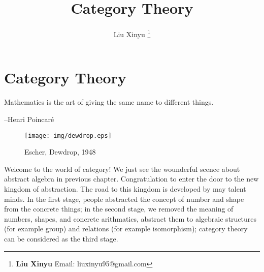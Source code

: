\documentclass{article}
\begin{document}
\title{Category Theory}

\author{Liu Xinyu
\thanks{{\bfseries Liu Xinyu} \newline
  Email: liuxinyu95@gmail.com \newline}
  }

\maketitle
\fi


\ifx\wholebook\relax
\chapter{Category Theory}
\fi

\epigraph{Mathematics is the art of giving the same name to different things.}{--Henri Poincaré}


\begin{wrapfigure}{R}{0.4\textwidth}
 \centering
 \texttt{[image: img/dewdrop.eps]}
 \captionsetup{labelformat=empty}
 \caption{Escher, Dewdrop, 1948}
 \label{fig:Escher-Dewdrop-1948}
\end{wrapfigure}

Welcome to the world of category! We just see the wounderful scence about abstract algebra in previous chapter. Congratulation to enter the door to the new kingdom of abstraction. The road to this kingdom is developed by may talent minds. In the first stage, people abstracted the concept of number and shape from the concrete things; in the second stage, we removed the meaning of numbers, shapes, and concrete arithmatics, abstract them to algebraic structures (for example group) and relations (for example isomorphism); category theory can be considered as the third stage.
\end{document}
